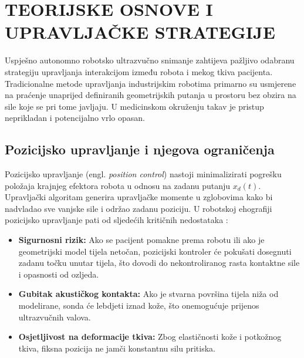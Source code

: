 
\section{TEORIJSKE OSNOVE I UPRAVLJAČKE STRATEGIJE}
\label{sec:metodologija}

Uspješno autonomno robotsko ultrazvučno snimanje zahtijeva pažljivo odabranu strategiju upravljanja interakcijom između robota i mekog tkiva pacijenta. Tradicionalne metode upravljanja industrijskim robotima primarno su usmjerene na praćenje unaprijed definiranih geometrijskih putanja u prostoru bez obzira na sile koje se pri tome javljaju. U medicinskom okruženju takav je pristup neprikladan i potencijalno vrlo opasan.

\subsection{Pozicijsko upravljanje i njegova ograničenja}
Pozicijsko upravljanje (engl. \textit{position control}) nastoji minimalizirati pogrešku položaja krajnjeg efektora robota u odnosu na zadanu putanju $x_d(t)$. Upravljački algoritam generira upravljačke momente u zglobovima kako bi nadvladao sve vanjske sile i održao zadanu poziciju. 
U robotskoj ehografiji pozicijsko upravljanje pati od sljedećih kritičnih nedostataka \cite{qin2026review, mathworks2025advanced}:
\begin{itemize}
    \item \textbf{Sigurnosni rizik:} Ako se pacijent pomakne prema robotu ili ako je geometrijski model tijela netočan, pozicijski kontroler će pokušati dosegnuti zadanu točku unutar tijela, što dovodi do nekontroliranog rasta kontaktne sile i opasnosti od ozljeda.
    \item \textbf{Gubitak akustičkog kontakta:} Ako je stvarna površina tijela niža od modelirane, sonda će lebdjeti iznad kože, što onemogućuje prijenos ultrazvučnih valova.
    \item \textbf{Osjetljivost na deformacije tkiva:} Zbog elastičnosti kože i potkožnog tkiva, fiksna pozicija ne jamči konstantnu silu pritiska.
\end{itemize}


